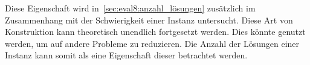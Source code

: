 Diese Eigenschaft wird in~\cref{sec:eval8:anzahl_lösungen} zusätzlich im Zusammenhang mit der Schwierigkeit einer Instanz untersucht.
Diese Art von Konstruktion kann theoretisch unendlich fortgesetzt werden.
Dies könnte genutzt werden, um auf andere Probleme zu reduzieren.
Die Anzahl der Lösungen einer Instanz kann somit als eine Eigenschaft dieser betrachtet werden.








